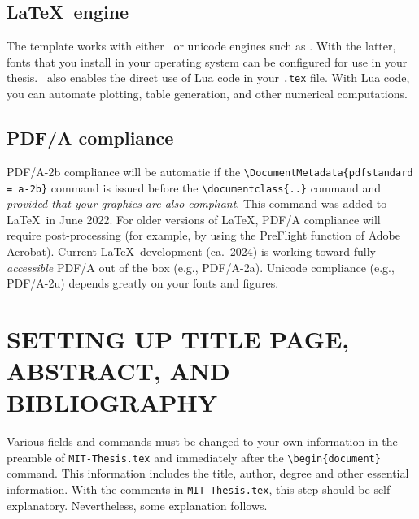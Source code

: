 \documentclass[11pt]{article}
\newcommand*\pdfTeX{\hologo{pdfTeX}}
\newcommand*\LuaLaTeX{\hologo{LuaLaTeX}}
\begin{document}
\subsection{\LaTeX\ engine}
The template works with either \pdfTeX\ or unicode engines such as \LuaLaTeX.  With the latter, fonts that you install in your operating system can be configured for use in your thesis. \LuaLaTeX\ also enables the direct use of Lua code in your \texttt{.tex} file. With Lua code, you can automate plotting, table generation, and other numerical computations.

\subsection{PDF/A compliance}
PDF/A-2b compliance will be automatic if the \verb|\DocumentMetadata{pdfstandard = a-2b}| command is issued before the \verb|\documentclass{..}| command and \textit{provided that your graphics are also compliant}. This command was added to \LaTeX\ in June 2022. For older versions of \LaTeX,
PDF/A compliance will require post-processing (for example, by using the PreFlight function of Adobe Acrobat).  Current \LaTeX\ development (ca.~2024) is working toward fully \textit{accessible} PDF/A out of the box (e.g., PDF/A-2a). Unicode compliance (e.g., PDF/A-2u) depends greatly on your fonts and figures.



\section{SETTING UP TITLE PAGE, ABSTRACT, AND BIBLIOGRAPHY}
Various fields and commands must be changed to your own information in the preamble of \texttt{MIT-Thesis.tex} and immediately after the \verb|\begin{document}| command. This information includes the title, author, degree and other essential information.  With the comments in \texttt{MIT-Thesis.tex}, this step should be self-explanatory. Nevertheless, some explanation follows.
\end{document}
